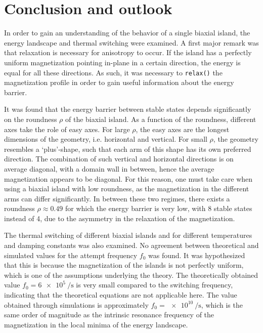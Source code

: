 \documentclass[11pt,a4paper,english,twoside]{article}
\newcommand{\code}[1]{\texttt{#1}}
\begin{document}
\section{Conclusion and outlook}
In order to gain an understanding of the behavior of a single biaxial island, the energy landscape and thermal switching were examined. A first major remark was that relaxation is necessary for anisotropy to occur. If the island has a perfectly uniform magnetization pointing in-plane in a certain direction, the energy is equal for all these directions. As such, it was necessary to \code{relax()} the magnetization profile in order to gain useful information about the energy barrier. \par
It was found that the energy barrier between stable states depends significantly on the roundness $\rho$ of the biaxial island. As a function of the roundness, different axes take the role of easy axes. For large $\rho$, the easy axes are the longest dimensions of the geometry, i.e. horizontal and vertical. For small $\rho$, the geometry resembles a `plus'-shape, such that each arm of this shape has its own preferred direction. The combination of such vertical and horizontal directions is on average diagonal, with a domain wall in between, hence the average magnetization appears to be diagonal. For this reason, one must take care when using a biaxial island with low roundness, as the magnetization in the different arms can differ significantly. In between these two regimes, there exists a roundness $\rho \approx 0.49$ for which the energy barrier is very low, with 8 stable states instead of 4, due to the asymmetry in the relaxation of the magnetization. \par
The thermal switching of different biaxial islands and for different temperatures and damping constants was also examined. No agreement between theoretical and simulated values for the attempt frequency $f_0$ was found. It was hypothesized that this is because the magnetization of the islands is not perfectly uniform, which is one of the assumptions underlying the theory. The theoretically obtained value $f_0=\SI{6e5}{\per\second}$ is very small compared to the switching frequency, indicating that the theoretical equations are not applicable here. The value obtained through simulations is approximately $f_0=\SI{e10}{\per\second}$, which is the same order of magnitude as the intrinsic resonance frequency of the magnetization in the local minima of the energy landscape. \par
\end{document}
